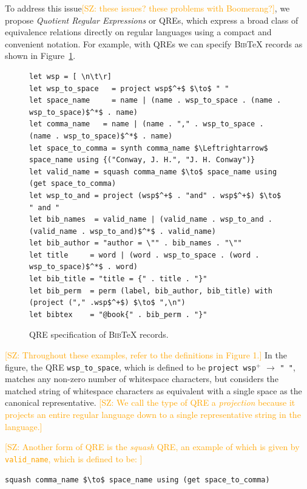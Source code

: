\documentclass{svproc}
\newcommand{\cd}[1]{\lstinline[backgroundcolor=\color{white}]$#1$}
\newcommand{\FINISH}[3]{\ifdraft\textcolor{#1}{[#2: #3]}\fi}
\newcommand{\saz}[1]{\FINISH{orange}{SZ}{#1}}
\newcommand{\bibtex}{\textsc{Bib}\TeX{}}
\begin{document}
To address this issue\saz{these issues? these problems with Boomerang?}, we propose {\em Quotient Regular Expressions} or QREs,
which express a broad class of equivalence relations directly on regular
languages using a compact and convenient notation. For example, with QREs we
can specify \bibtex{} records as shown in Figure~\ref{fig:example-qre}.

\begin{figure}[t]
\begin{lstlisting}
let wsp = [ \n\t\r]
let wsp_to_space   = project wsp$^+$ $\to$ " "
let space_name     = name | (name . wsp_to_space . (name . wsp_to_space)$^*$ . name)
let comma_name   = name | (name . "," . wsp_to_space . (name . wsp_to_space)$^*$ . name)
let space_to_comma = synth comma_name $\Leftrightarrow$ space_name using {("Conway, J. H.", "J. H. Conway")} 
let valid_name = squash comma_name $\to$ space_name using (get space_to_comma)
let wsp_to_and = project (wsp$^+$ . "and" . wsp$^+$) $\to$ " and " 
let bib_names  = valid_name | (valid_name . wsp_to_and . (valid_name . wsp_to_and)$^*$ . valid_name) 
let bib_author = "author = \"" . bib_names . "\""
let title     = word | (word . wsp_to_space . (word . wsp_to_space)$^*$ . word) 
let bib_title = "title = {" . title . "}" 
let bib_perm  = perm (label, bib_author, bib_title) with (project ("," .wsp$^+$) $\to$ ",\n")
let bibtex    = "@book{" . bib_perm . "}"
\end{lstlisting}
\caption{QRE specification of \bibtex{} records. }
  \label{fig:example-qre}
\end{figure}

\saz{Throughout these examples, refer to the definitions in Figure 1.}  In the
figure, the QRE \cd{wsp_to_space}, which is defined to be \cd{project wsp}$^+$
$\to$ \cd{" "}, matches any non-zero number of whitespace characters, but
considers the matched string of whitespace characters as equivalent with a
single space as the canonical representative.  \saz{We call the type of QRE a
\textit{projection} because it projects an entire regular language down to a single
representative string in the language.}

\saz{
Another form of QRE is the \textit{squash} QRE, an example of which is given by
\cd{valid_name}, which is defined to be:
}

\begin{center}
\begin{lstlisting}
squash comma_name $\to$ space_name using (get space_to_comma)
\end{lstlisting}
\end{center}
\end{document}
